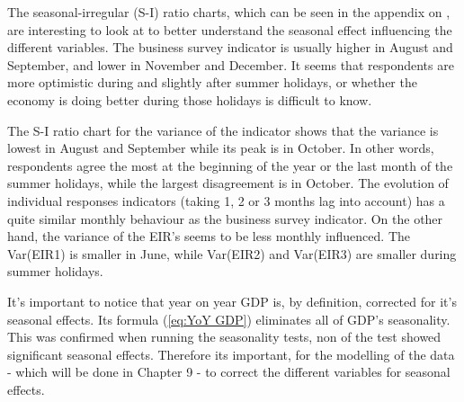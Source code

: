 \documentclass[12pt,a4paper,oneside]{book}
\begin{document}


The seasonal-irregular (S-I) ratio charts, which can be seen in the appendix on , are interesting to look at to better understand the seasonal effect influencing the different variables.
The business survey indicator is usually higher in August and September, and lower in November and December. 
It seems that respondents are more optimistic during and slightly after summer holidays, or whether the economy is doing better during those holidays is difficult to know.

The S-I ratio chart for the variance of the indicator shows that the variance is lowest in August and September while its peak is in October. In other words, respondents agree the most at the beginning of the year or the last month of the summer holidays, while the largest disagreement is in October.
The evolution of individual responses indicators (taking 1, 2 or 3 months lag into account) has a quite similar monthly behaviour as the business survey indicator.
On the other hand, the variance of the EIR's seems to be less monthly influenced. The Var(EIR1) is smaller in June, while Var(EIR2) and Var(EIR3) are smaller during summer holidays.

It's important to notice that year on year GDP is, by definition, corrected for it's seasonal effects. Its formula (\autoref{eq:YoY GDP}) eliminates all of GDP's seasonality.
This was confirmed when running the seasonality tests, non of the test showed significant seasonal effects.
Therefore its important, for the modelling of the data - which will be done in Chapter 9 - to correct the different variables for seasonal effects.
\end{document}
